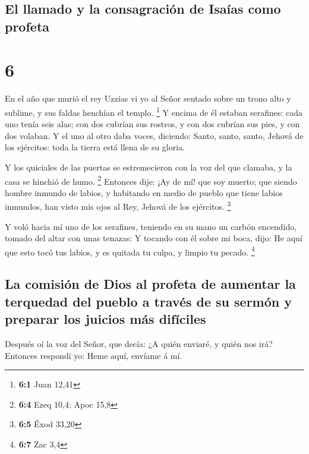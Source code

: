 \hypertarget{el-llamado-y-la-consagraciuxf3n-de-isauxedas-como-profeta}{%
\subsection{El llamado y la consagración de Isaías como
profeta}\label{el-llamado-y-la-consagraciuxf3n-de-isauxedas-como-profeta}}

\hypertarget{section-5}{%
\section{6}\label{section-5}}

 En el año que murió el rey Uzzías vi yo al Señor sentado
sobre un trono alto y sublime, y sus faldas henchían el templo.
\footnote{\textbf{6:1} Juan 12,41}  Y encima de él estaban
serafines: cada uno tenía seis alas; con dos cubrían sus rostros, y con
dos cubrían sus pies, y con dos volaban.  Y el uno al otro
daba voces, diciendo: Santo, santo, santo, Jehová de los ejércitos: toda
la tierra está llena de su gloria.

 Y los quiciales de las puertas se estremecieron con la voz
del que clamaba, y la casa se hinchió de humo. \footnote{\textbf{6:4}
  Ezeq 10,4; Apoc 15,8}  Entonces dije: ¡Ay de mí! que soy
muerto; que siendo hombre inmundo de labios, y habitando en medio de
pueblo que tiene labios inmundos, han visto mis ojos al Rey, Jehová de
los ejércitos. \footnote{\textbf{6:5} Éxod 33,20}

 Y voló hacia mí uno de los serafines, teniendo en su mano
un carbón encendido, tomado del altar con unas tenazas:  Y
tocando con él sobre mi boca, dijo: He aquí que esto tocó tus labios, y
es quitada tu culpa, y limpio tu pecado. \footnote{\textbf{6:7} Zac 3,4}

\hypertarget{la-comisiuxf3n-de-dios-al-profeta-de-aumentar-la-terquedad-del-pueblo-a-travuxe9s-de-su-sermuxf3n-y-preparar-los-juicios-muxe1s-difuxedciles}{%
\subsection{La comisión de Dios al profeta de aumentar la terquedad del
pueblo a través de su sermón y preparar los juicios más
difíciles}\label{la-comisiuxf3n-de-dios-al-profeta-de-aumentar-la-terquedad-del-pueblo-a-travuxe9s-de-su-sermuxf3n-y-preparar-los-juicios-muxe1s-difuxedciles}}

 Después oí la voz del Señor, que decía: ¿A quién enviaré, y
quién nos irá? Entonces respondí yo: Heme aquí, envíame á mí.

